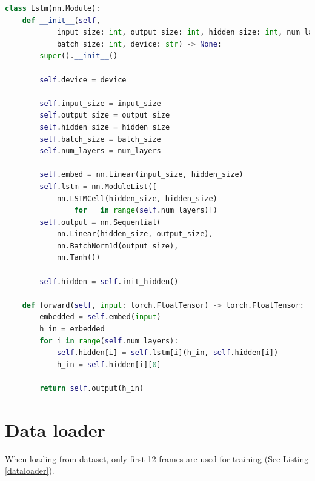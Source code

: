 \begin{lstlisting}[language=Python, caption={Python code of \textcolor{blue}{\textbf{Lstm}} (some code is omitted).}, label={predictor}]
class Lstm(nn.Module):
    def __init__(self, 
            input_size: int, output_size: int, hidden_size: int, num_layers: int, 
            batch_size: int, device: str) -> None:
        super().__init__()
        
        self.device = device
        
        self.input_size = input_size
        self.output_size = output_size
        self.hidden_size = hidden_size
        self.batch_size = batch_size
        self.num_layers = num_layers
        
        self.embed = nn.Linear(input_size, hidden_size)
        self.lstm = nn.ModuleList([
            nn.LSTMCell(hidden_size, hidden_size) 
                for _ in range(self.num_layers)])
        self.output = nn.Sequential(
            nn.Linear(hidden_size, output_size),
            nn.BatchNorm1d(output_size),
            nn.Tanh())
        
        self.hidden = self.init_hidden()

    def forward(self, input: torch.FloatTensor) -> torch.FloatTensor:
        embedded = self.embed(input)
        h_in = embedded
        for i in range(self.num_layers):
            self.hidden[i] = self.lstm[i](h_in, self.hidden[i])
            h_in = self.hidden[i][0]

        return self.output(h_in)
\end{lstlisting}

\section{Data loader}
\indent
    When loading from dataset, only first 12 frames are used for training (See Listing \ref{dataloader}).

